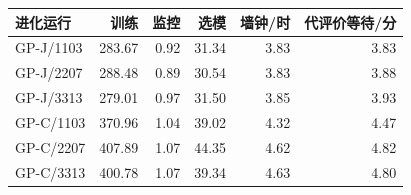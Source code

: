 \begin{tabular}{@{}lrrrrr@{}}
\toprule
进化运行 & 训练 & 监控 & 选模 & 墙钟/时 & 代评价等待/分 \\ \midrule
GP-J/1103 & 283.67 & 0.92 & 31.34 & 3.83 & 3.83 \\
GP-J/2207 & 288.48 & 0.89 & 30.54 & 3.83 & 3.88 \\
GP-J/3313 & 279.01 & 0.97 & 31.50 & 3.85 & 3.93 \\
GP-C/1103 & 370.96 & 1.04 & 39.02 & 4.32 & 4.47 \\
GP-C/2207 & 407.89 & 1.07 & 44.35 & 4.62 & 4.82 \\
GP-C/3313 & 400.78 & 1.07 & 39.34 & 4.63 & 4.80 \\
\bottomrule
\end{tabular}
